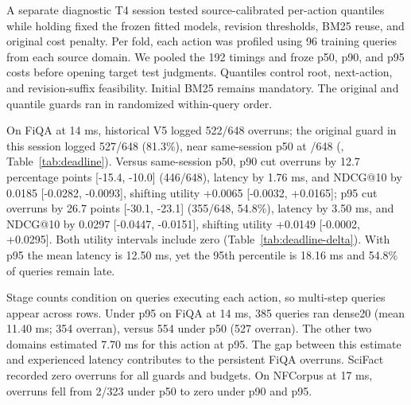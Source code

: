 A separate diagnostic T4 session tested source-calibrated per-action quantiles while holding fixed the frozen fitted models, revision thresholds, BM25 reuse, and original cost penalty. Per fold, each action was profiled using 96 training queries from each source domain. We pooled the 192 timings and froze p50, p90, and p95 costs before opening target test judgments. Quantiles control root, next-action, and revision-suffix feasibility. Initial BM25 remains mandatory. The original and quantile guards ran in randomized within-query order.

On FiQA at 14 ms, historical V5 logged 522/648 overruns; the original guard in this session logged 527/648 (81.3\%), near same-session p50 at \MedianCount{}/648 (\MedianRate{}, Table~\ref{tab:deadline}). Versus same-session p50, p90 cut overruns by 12.7 percentage points [-15.4, -10.0] (446/648), latency by 1.76 ms, and NDCG@10 by 0.0185 [-0.0282, -0.0093], shifting utility +0.0065 [-0.0032, +0.0165]; p95 cut overruns by 26.7 points [-30.1, -23.1] (355/648, 54.8\%), latency by 3.50 ms, and NDCG@10 by 0.0297 [-0.0447, -0.0151], shifting utility +0.0149 [-0.0002, +0.0295]. Both utility intervals include zero (Table~\ref{tab:deadline-delta}). With p95 the mean latency is 12.50 ms, yet the 95th percentile is 18.16 ms and 54.8\% of queries remain late.

Stage counts condition on queries executing each action, so multi-step queries appear across rows. Under p95 on FiQA at 14 ms, 385 queries ran dense20 (mean 11.40 ms; 354 overran), versus 554 under p50 (527 overran). The other two domains estimated 7.70 ms for this action at p95. The gap between this estimate and experienced latency contributes to the persistent FiQA overruns. SciFact recorded zero overruns for all guards and budgets. On NFCorpus at 17 ms, overruns fell from 2/323 under p50 to zero under p90 and p95.

